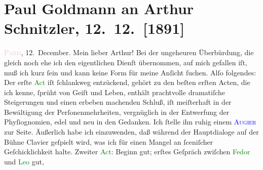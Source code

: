 

               \section[Paul Goldmann an Arthur Schnitzler, 12. 12. {[}1891{]}]{ Paul Goldmann an Arthur Schnitzler, 12. 12. {[}1891{]}}\nopagebreak{}\rehead{ }\normalsize\beginnumbering{} \toendnotes[C]{\smallbreak\pagebreak[2]} 
\toendnotes[C]{\smallbreak}\pstart
           \raggedleft{}{\pb}\textsc{\textcolor{pink}{Paris}{}\ledrightnote{\textcolor{pink}{Paris}}}, 12. December.\pend
           \pstart\center{}Mein lieber Arthur!\pend\pstart
           Bei der ungeheuren Überbürdung, die gleich noch ehe ich den eigentlichen Dienſt
               übernommen, auf mich gefallen iſt, muß ich kurz ſein und kann keine Form für meine
               Anſicht ſuchen. Alſo folgendes: Der erſte \textcolor{green}{Act}{} iſt ſchlankweg entzückend, gehört zu den beſten erſten
               Acten, die ich kenne, ſprüht von Geiſt und Leben, enthält prachtvolle dramatiſche
               Steigerungen und einen  erbeben machenden Schluß,
               iſt meiſterhaft in der Bewältigung der Perſonenmehrheiten, vergnüglich in der
               Entwerfung der Phyſiognomien, edel und neu in den Gedanken. Ich ſtelle ihn ruhig
               einem \textsc{\textcolor{blue}{Augier}{}\ledrightnote{\textcolor{blue}{Émile Augier}}} zur Seite. Äußerlich habe ich einzuwenden, daß während der Hauptdialoge auf der
               Bühne Clavier geſpielt wird, was ich für einen Mangel an ſceniſcher Geſchicklichkeit
               halte. Zweiter \textcolor{green}{Act}{}: Beginn
               gut; erſtes Geſpräch zwiſchen \textcolor{green}{Fedor}{} und \textcolor{green}{Leo}{} gut,
